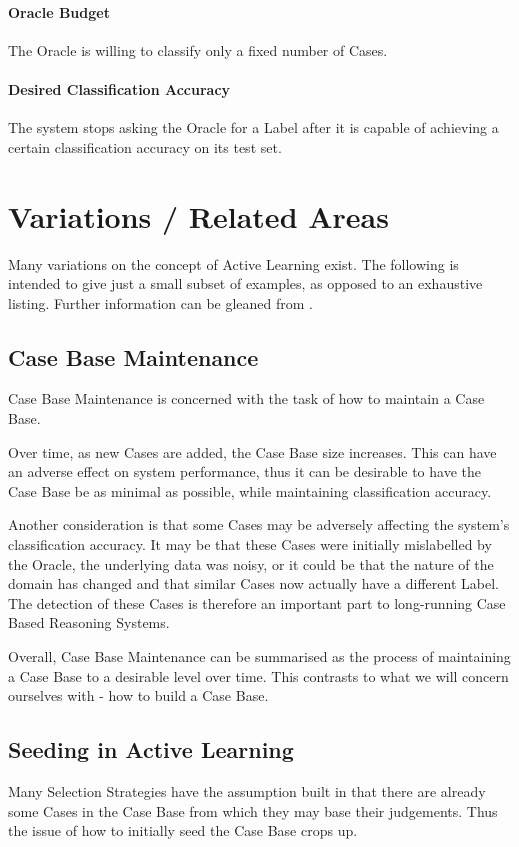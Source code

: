 \documentclass[a4paper,11pt]{report}
\begin{document}
\paragraph{Oracle Budget} 
The Oracle is willing to classify only a fixed number of Cases.

\paragraph{Desired Classification Accuracy} 
The system stops asking the Oracle for a Label after it is capable of achieving a certain classification accuracy on its test set.

\section{Variations / Related Areas}
Many variations on the concept of Active Learning exist. The following is intended to give just a small subset of examples, as opposed to an exhaustive listing. Further information can be gleaned from \citep{Settles2010}.

\subsection{Case Base Maintenance}
Case Base Maintenance is concerned with the task of how to maintain a Case Base. 

Over time, as new Cases are added, the Case Base size increases. This can have an adverse effect on system performance, thus it can be desirable to have the Case Base be as minimal as possible, while maintaining classification accuracy.

Another consideration is that some Cases may be adversely affecting the system's classification accuracy. It may be that these Cases were initially mislabelled by the Oracle, the underlying data was noisy, or it could be that the nature of the domain has changed and that similar Cases now actually have a different Label. The detection of these Cases is therefore an important part to long-running Case Based Reasoning Systems.

Overall, Case Base Maintenance can be summarised as the process of maintaining a Case Base to a desirable level over time. This contrasts to what we will concern ourselves with - how to build a Case Base.

\subsection{Seeding in Active Learning}
Many Selection Strategies have the assumption built in that there are already some Cases in the Case Base from which they may base their judgements. Thus the issue of how to initially seed the Case Base crops up.
\end{document}
